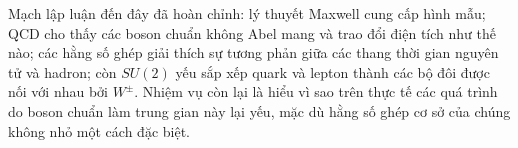 \begin{classroomqa}
\end{classroomqa}

Mạch lập luận đến đây đã hoàn chỉnh: lý thuyết Maxwell cung cấp hình mẫu; QCD cho thấy các boson chuẩn không Abel mang và trao đổi điện tích như thế nào; các hằng số ghép giải thích sự tương phản giữa các thang thời gian nguyên tử và hadron; còn \(SU(2)\) yếu sắp xếp quark và lepton thành các bộ đôi được nối với nhau bởi \(W^\pm\). Nhiệm vụ còn lại là hiểu vì sao trên thực tế các quá trình do boson chuẩn làm trung gian này lại yếu, mặc dù hằng số ghép cơ sở của chúng không nhỏ một cách đặc biệt.
